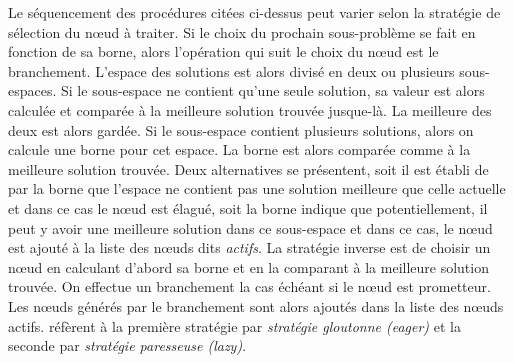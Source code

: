 \documentclass[12pt,a4paper,oneside]{book}
\theoremstyle{definition}
\begin{document}
	Le séquencement des procédures citées ci-dessus peut varier selon la stratégie de sélection du nœud à traiter. Si le choix du prochain sous-problème se fait en fonction de sa borne, alors l'opération qui suit le choix du nœud est le branchement. L'espace des solutions est alors divisé en deux ou plusieurs sous-espaces. Si le sous-espace ne contient qu'une seule solution, sa valeur est alors calculée et comparée à la meilleure solution trouvée jusque-là. La meilleure des deux est alors gardée. Si le sous-espace contient plusieurs solutions, alors on calcule une borne pour cet espace. La borne est alors comparée comme à la meilleure solution trouvée. Deux alternatives se présentent, soit il est établi de par la borne que l'espace ne contient pas une solution meilleure que celle actuelle et dans ce cas le nœud est élagué, soit la borne indique que potentiellement, il peut y avoir une meilleure solution dans ce sous-espace et dans ce cas, le nœud est ajouté à la liste des nœuds dits \textit{actifs}. La stratégie inverse est de choisir un nœud en calculant d'abord sa borne et en la comparant à la meilleure solution trouvée. On effectue un branchement la cas échéant si le nœud est prometteur. Les nœuds générés par le branchement sont alors ajoutés dans la liste des nœuds actifs. \cite{Clausen1999} réfèrent à la première stratégie par \textit{stratégie gloutonne (eager)} et la seconde par \textit{stratégie paresseuse (lazy)}.  
\end{document}
